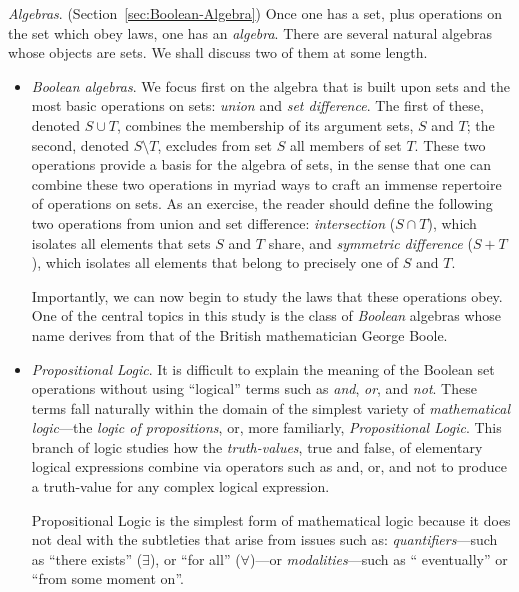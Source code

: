 {\it Algebras}.  (Section~\ref{sec:Boolean-Algebra})
 Once one has a set, plus
operations on the set which obey laws, one has an {\it algebra}.
 There are several natural algebras whose
objects are sets.  We shall discuss two of them at some length.
\begin{itemize}
\item
{\it Boolean algebras}.  We focus first on the algebra that is built
upon sets and the most basic operations on sets: {\it union} and {\it
  set difference}.  The first of these, denoted $S \cup T$, combines
the membership of its argument sets, $S$ and $T$; the second, denoted
$S \setminus T$, excludes from set $S$ all members of set $T$.  These
two operations provide a basis for the algebra of sets, in the sense
that one can combine these two operations in myriad ways to craft an
immense repertoire of operations on sets.  As an exercise, the reader
should define the following two operations from union and set
difference: {\it intersection} ($S \cap T$), which isolates all
elements that sets $S$ and $T$ share, and {\it symmetric difference}
($S+T$), which isolates all elements that belong to precisely one of
$S$ and $T$.

Importantly, we can now begin to study the laws that these operations
obey.  One of the central topics in this study is the class of {\it
  Boolean} algebras  whose name
derives from that of the British mathematician George
Boole. 

\item
{\it Propositional Logic}.  
It is difficult to explain the meaning of the Boolean set operations
without using ``logical'' terms such as {\it and}, {\it or}, and {\it
  not}.  These terms fall naturally within the domain of the simplest
variety of {\it mathematical logic}---the {\it logic of propositions},
or, more familiarly, {\it Propositional Logic}.  This branch of logic
studies how the {\em truth-values}, {\sc true} and {\sc false}, of
elementary logical expressions combine via operators such as {\sc
  and}, {\sc or}, and {\sc not} to produce a truth-value for any
complex logical expression.

Propositional Logic is the simplest form of mathematical logic because
it does not deal with the subtleties that arise from issues such as:
{\it quantifiers}---such as ``{\sc there exists}'' ($\exists$), or
``{\sc for all}'' ($\forall$)---or {\it modalities}---such as ``{\sc
  eventually}'' or ``{\sc from some moment on}''.


\end{itemize}
